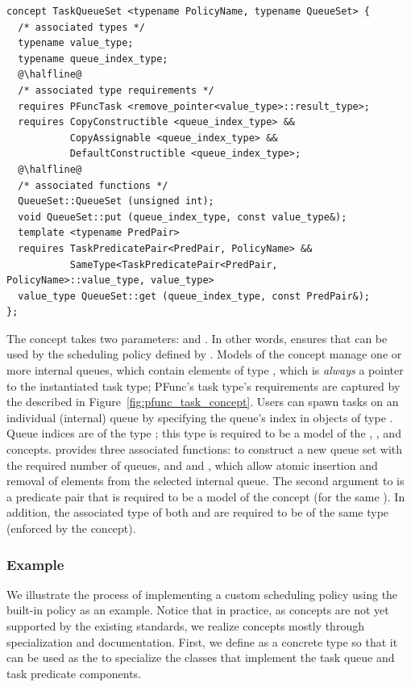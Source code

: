 \begin{lstlisting}[columns=flexible]
concept TaskQueueSet <typename PolicyName, typename QueueSet> {
  /* associated types */
  typename value_type;
  typename queue_index_type;
  @\halfline@
  /* associated type requirements */
  requires PFuncTask <remove_pointer<value_type>::result_type>;
  requires CopyConstructible <queue_index_type> && 
           CopyAssignable <queue_index_type> &&
           DefaultConstructible <queue_index_type>;
  @\halfline@
  /* associated functions */
  QueueSet::QueueSet (unsigned int);
  void QueueSet::put (queue_index_type, const value_type&);
  template <typename PredPair>
  requires TaskPredicatePair<PredPair, PolicyName> &&
           SameType<TaskPredicatePair<PredPair, PolicyName>::value_type, value_type>
  value_type QueueSet::get (queue_index_type, const PredPair&);
};
\end{lstlisting}

The  concept takes two parameters: 
and .
%
In other words,  ensures that  can
be used by the scheduling policy defined by .
%
Models of the  concept manage one or more internal
queues, which contain elements of type , which is
\textit{always} a pointer to the instantiated task type; PFunc's task type's
requirements are captured by the  described in
Figure~\ref{fig:pfunc_task_concept}.
%
Users can spawn tasks on an individual (internal) queue by specifying the
queue's index in objects of type .
%
Queue indices are of the type ; this type is required
to be a model of the , ,
and  concepts.
%
 provides three associated functions:
 to construct a new queue set with the required number
of queues, and  and , which allow
atomic insertion and removal of elements from the selected internal queue.
%
The second argument to  is a predicate pair that is
required to be a model of the  concept (for the
same ).
%
In addition, the  associated type of both 
and  are required to be of the same type (enforced by the
 concept).
%

\subsubsection{Example}
\label{subsubsec:scheduling_example}
%
We illustrate the process of implementing a custom scheduling policy using the
built-in  policy as an example. 
%
Notice that in practice, as concepts are not yet supported by the existing 
\Cpp{} standards, we realize concepts mostly through specialization and 
documentation.
%
First, we define  as a concrete type so that it can be used as the
 to specialize the classes that implement the task queue and
task predicate components.
%

